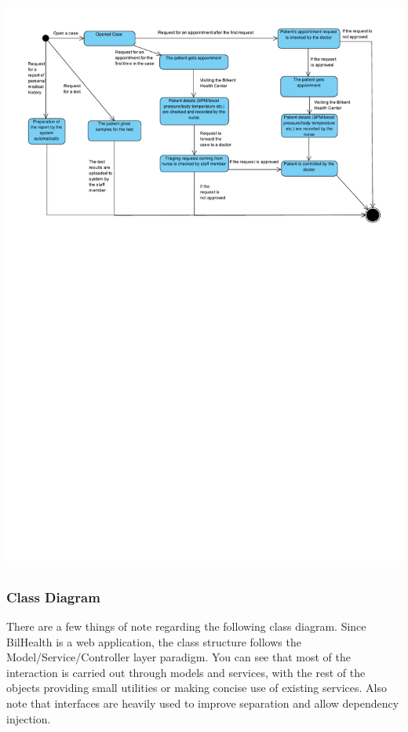 \documentclass[a4paper, 12pt, titlepage]{article}
\begin{document}
  \includegraphics[width=\linewidth]{state_diag_patient.pdf}

  \pagebreak
  \subsubsection{Class Diagram}

  There are a few things of note regarding the following class diagram.
  Since BilHealth is a web application, the class structure follows the Model/Service/Controller layer paradigm.
  You can see that most of the interaction is carried out through models and services, with the rest of the objects
  providing small utilities or making concise use of existing services.
  Also note that interfaces are heavily used to improve separation and allow dependency injection.
\end{document}
